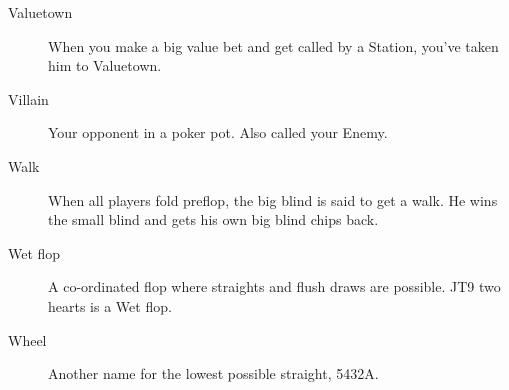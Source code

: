 \begin{description}
\item[Valuetown] When you make a big value bet and get called by
a Station, you've taken him to Valuetown.

\item[Villain] Your opponent in a poker pot. Also called your Enemy.

\item[Walk] When all players fold preflop, the big blind is said to
get a walk. He wins the small blind and gets his own big blind chips
back.

\item[Wet flop] A co-ordinated flop where straights and flush draws
are possible. JT9 two hearts is a Wet flop.

\item[Wheel] Another name for the lowest possible straight, 5432A.

\end{description}
